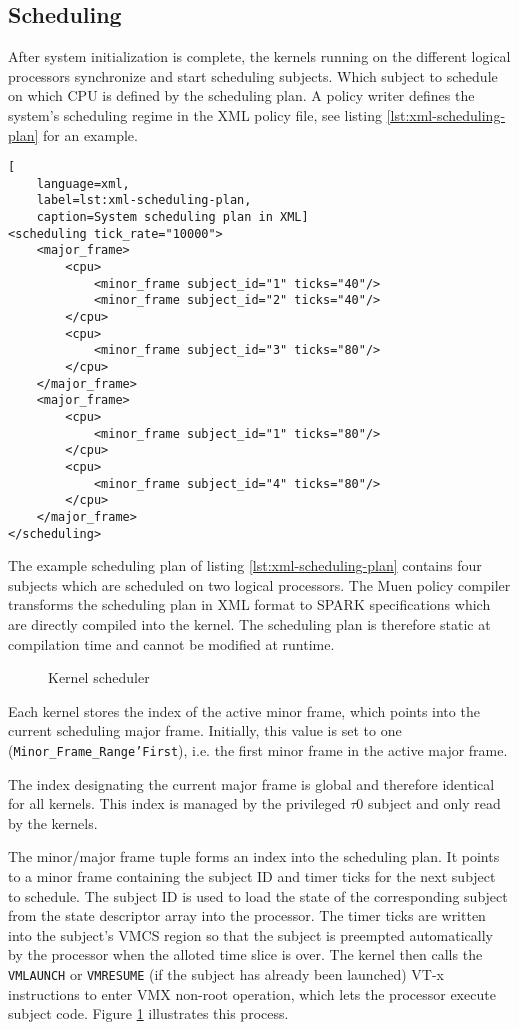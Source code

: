 \subsection{Scheduling}\label{subsec:scheduling}
After system initialization is complete, the kernels running on the different
logical processors synchronize and start scheduling subjects. Which subject to
schedule on which CPU is defined by the scheduling plan. A policy writer defines
the system's scheduling regime in the XML policy file, see listing
\ref{lst:xml-scheduling-plan} for an example.

\begin{lstlisting}[
	language=xml,
	label=lst:xml-scheduling-plan,
	caption=System scheduling plan in XML]
<scheduling tick_rate="10000">
	<major_frame>
		<cpu>
			<minor_frame subject_id="1" ticks="40"/>
			<minor_frame subject_id="2" ticks="40"/>
		</cpu>
		<cpu>
			<minor_frame subject_id="3" ticks="80"/>
		</cpu>
	</major_frame>
	<major_frame>
		<cpu>
			<minor_frame subject_id="1" ticks="80"/>
		</cpu>
		<cpu>
			<minor_frame subject_id="4" ticks="80"/>
		</cpu>
	</major_frame>
</scheduling>
\end{lstlisting}

The example scheduling plan of listing \ref{lst:xml-scheduling-plan} contains
four subjects which are scheduled on two logical processors. The Muen policy
compiler transforms the scheduling plan in XML format to SPARK specifications
which are directly compiled into the kernel. The scheduling plan is therefore
static at compilation time and cannot be modified at runtime.

\begin{figure}[h]
	\centering
	
	\caption{Kernel scheduler}
	\label{fig:kernel-scheduler}
\end{figure}

Each kernel stores the index of the active minor frame, which points into the
current scheduling major frame. Initially, this value is set to one
(\texttt{Minor\_Frame\_Range'First}), i.e. the first minor frame in the active
major frame.

The index designating the current major frame is global and therefore identical
for all kernels. This index is managed by the privileged $\tau$0 subject and
only read by the kernels.

The minor/major frame tuple forms an index into the scheduling plan. It points
to a minor frame containing the subject ID and timer ticks for the next subject
to schedule. The subject ID is used to load the state of the corresponding
subject from the state descriptor array into the processor. The timer ticks are
written into the subject's VMCS region so that the subject is preempted
automatically by the processor when the alloted time slice is over. The kernel
then calls the \texttt{VMLAUNCH} or \texttt{VMRESUME} (if the subject has
already been launched) VT-x instructions to enter VMX non-root operation, which
lets the processor execute subject code. Figure \ref{fig:kernel-scheduler}
illustrates this process.

